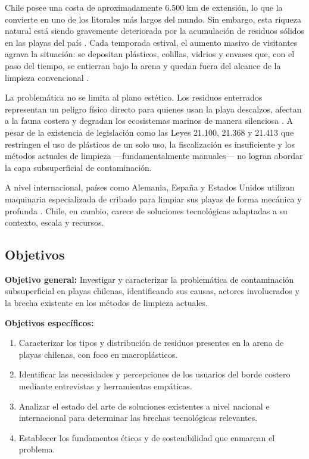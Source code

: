 \documentclass[12pt, letterpaper]{article}
\begin{document}
Chile posee una costa de aproximadamente 6.500 km de extensión, lo que la convierte
en uno de los litorales más largos del mundo. Sin embargo, esta riqueza natural está
siendo gravemente deteriorada por la acumulación de residuos sólidos en las playas del
país \parencite{bravo_2009}. Cada temporada estival, el aumento masivo de visitantes
agrava la situación: se depositan plásticos, colillas, vidrios y envases que, con el paso
del tiempo, se entierran bajo la arena y quedan fuera del alcance de la limpieza
convencional \parencite{radio_uchile_2025}.

La problemática no se limita al plano estético. Los residuos enterrados representan un
peligro físico directo para quienes usan la playa descalzos, afectan a la fauna costera
y degradan los ecosistemas marinos de manera silenciosa \parencite{oceana_2026}.
A pesar de la existencia de legislación como las Leyes 21.100, 21.368 y 21.413 que
restringen el uso de plásticos de un solo uso, la fiscalización es insuficiente y los
métodos actuales de limpieza ---fundamentalmente manuales--- no logran abordar la
capa subsuperficial de contaminación.

A nivel internacional, países como Alemania, España y Estados Unidos utilizan maquinaria
especializada de cribado para limpiar sus playas de forma mecánica y profunda
\parencite{beachtech_2020}. Chile, en cambio, carece de soluciones tecnológicas adaptadas
a su contexto, escala y recursos.

\subsection{Objetivos}

\textbf{Objetivo general:} Investigar y caracterizar la problemática de contaminación
subsuperficial en playas chilenas, identificando sus causas, actores involucrados
y la brecha existente en los métodos de limpieza actuales.

\textbf{Objetivos específicos:}
\begin{enumerate}
	\item Caracterizar los tipos y distribución de residuos presentes en la arena de
	      playas chilenas, con foco en macroplásticos.
	\item Identificar las necesidades y percepciones de los usuarios del borde costero
	      mediante entrevistas y herramientas empáticas.
	\item Analizar el estado del arte de soluciones existentes a nivel nacional e
	      internacional para determinar las brechas tecnológicas relevantes.
	\item Establecer los fundamentos éticos y de sostenibilidad que enmarcan el problema.
\end{enumerate}
\end{document}
